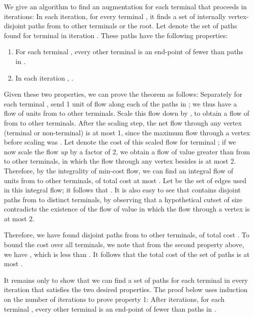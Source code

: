 \documentclass[11pt]{article}
\newenvironment{proofof}[1]{\smallskip\noindent{\bf Proof of #1:}}{\hspace*{\fill}\par}
\begin{document}
\begin{proofof}{Theorem~\ref{thm:kconnAug}}
  \iffalse
  An optimal solution contains an augmentation for each terminal, and
  so for each terminal , . Hence, we may
  assume that there are at least  terminals, or we are done
  immediately.
  \fi
  We give an algorithm to find an augmentation for each terminal that
  proceeds in  iterations: In each iteration, for every terminal
  , it finds a set of  internally vertex-disjoint paths from 
  to other terminals or the root. Let  denote the set
  of paths found for terminal  in iteration . These paths have
  the following properties:
  \begin{enumerate}
    \item For each terminal , every other terminal is an end-point
      of fewer than  paths in .
      
    \item In each iteration , .
  \end{enumerate}

  Given these two properties, we can prove the theorem as follows:
  Separately for each terminal , send 1 unit of flow along each of
  the paths in ; we thus have a flow of
   units from  to other terminals. Scale this flow
  down by , to obtain a flow of
   from  to other terminals.  After
  the scaling step, the net flow through any vertex (terminal or
  non-terminal) is at most 1, since the maximum flow through a vertex
  before scaling was . Let  denote the cost of
  this scaled flow for terminal ; if we now scale the flow
  \emph{up} by a factor of 2, we obtain a flow of value greater than
   from  to other terminals, in which the flow through any
  vertex besides  is at most 2. Therefore, by the integrality of
  min-cost flow, we can find an integral flow of  units from 
  to other terminals, of total cost at most . Let 
  be the set of edges used in this integral flow; it follows that
  . It is also easy to see that 
  contains  disjoint paths from  to  distinct terminals, by
  observing that a hypothetical cutset of size  contradicts the
  existence of the flow of value  in which the flow through a
  vertex is at most 2.

  Therefore, we have found  disjoint paths from  to  other
  terminals, of total cost . To bound the cost over all
  terminals, we note that from the second property above, we have
  , which is less than . It follows
  that the total cost of the set of paths is at most .


  \bigskip 
  It remains only to show that we can find a set of paths for each
  terminal in every iteration that satisfies the two desired
  properties.  The proof below uses induction on the number of
  iterations  to prove property 1: After  iterations, for each
  terminal , every other terminal is an end-point of fewer than  paths in .


\end{proofof}
\end{document}
